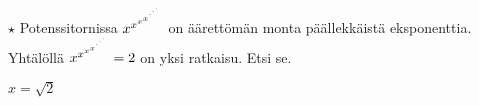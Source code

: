 \begin{tehtavasivu}
\begin{tehtava} %
	$\star$ Potenssitornissa $x^{x^{x^{x^{\mathstrut^{.^{.^{.}}}}}}}$ on äärettömän monta päällekkäistä eksponenttia. Yhtälöllä $ x^{x^{x^{x^{\mathstrut^{.^{.^{.}}}}}}} =2$ on yksi ratkaisu. Etsi se.
\begin{vastaus}
	$x = \sqrt{2}$
\end{vastaus}
\end{tehtava}

\end{tehtavasivu}